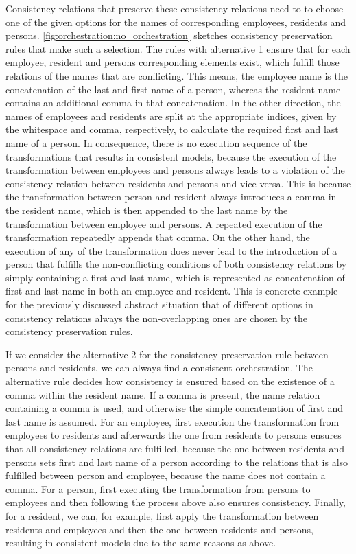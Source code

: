 Consistency relations that preserve these consistency relations need to to choose one of the given options for the names of corresponding employees, residents and persons.
\autoref{fig:orchestration:no_orchestration} sketches consistency preservation rules that make such a selection.
The rules with alternative 1 ensure that for each employee, resident and persons corresponding elements exist, which fulfill those relations of the names that are conflicting.
This means, the employee name is the concatenation of the last and first name of a person, whereas the resident name contains an additional comma in that concatenation.
In the other direction, the names of employees and residents are split at the appropriate indices, given by the whitespace and comma, respectively, to calculate the required first and last name of a person.
In consequence, there is no execution sequence of the transformations that results in consistent models, because the execution of the transformation between employees and persons always leads to a violation of the consistency relation between residents and persons and vice versa.
This is because the transformation between person and resident always introduces a comma in the resident name, which is then appended to the last name by the transformation between employee and persons.
A repeated execution of the transformation repeatedly appends that comma.
On the other hand, the execution of any of the transformation does never lead to the introduction of a person that fulfills the non-conflicting conditions of both consistency relations by simply containing a first and last name, which is represented as concatenation of first and last name in both an employee and resident.
This is concrete example for the previously discussed abstract situation that of different options in consistency relations always the non-overlapping ones are chosen by the consistency preservation rules.

If we consider the alternative 2 for the consistency preservation rule between persons and residents, we can always find a consistent orchestration.
The alternative rule decides how consistency is ensured based on the existence of a comma within the resident name.
If a comma is present, the name relation containing a comma is used, and otherwise the simple concatenation of first and last name is assumed.
For an employee, first execution the transformation from employees to residents and afterwards the one from residents to persons ensures that all consistency relations are fulfilled, because the one between residents and persons sets first and last name of a person according to the relations that is also fulfilled between person and employee, because the name does not contain a comma.
For a person, first executing the transformation from persons to employees and then following the process above also ensures consistency.
Finally, for a resident, we can, for example, first apply the transformation between residents and employees and then the one between residents and persons, resulting in consistent models due to the same reasons as above.


